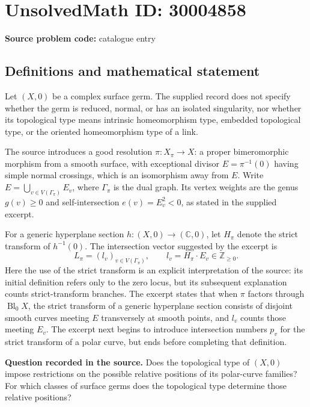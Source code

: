 \documentclass[11pt]{article}
\newcommand{\Z}{\mathbb{Z}}
\newcommand{\C}{\mathbb{C}}
\begin{document}
\section*{UnsolvedMath ID: 30004858}
\textbf{Source problem code:} catalogue entry
\subsection{Definitions and mathematical statement}
Let \((X,0)\) be a complex surface germ. The supplied record does not specify whether the germ is reduced, normal, or has an isolated singularity, nor whether its topological type means intrinsic homeomorphism type, embedded topological type, or the oriented homeomorphism type of a link.

The source introduces a good resolution \(\pi:X_\pi\to X\): a proper bimeromorphic morphism from a smooth surface, with exceptional divisor \(E=\pi^{-1}(0)\) having simple normal crossings, which is an isomorphism away from \(E\). Write \(E=\bigcup_{v\in V(\Gamma_\pi)}E_v\), where \(\Gamma_\pi\) is the dual graph. Its vertex weights are the genus \(g(v)\geq 0\) and self-intersection \(e(v)=E_v^2<0\), as stated in the supplied excerpt.

For a generic hyperplane section \(h:(X,0)\to(\C,0)\), let \(H_\pi\) denote the strict transform of \(h^{-1}(0)\). The intersection vector suggested by the excerpt is
\[
L_\pi=(l_v)_{v\in V(\Gamma_\pi)},\qquad l_v=H_\pi\cdot E_v\in\Z_{\geq0}.
\]
Here the use of the strict transform is an explicit interpretation of the source: its initial definition refers only to the zero locus, but its subsequent explanation counts strict-transform branches. The excerpt states that when \(\pi\) factors through \(\operatorname{Bl}_0X\), the strict transform of a generic hyperplane section consists of disjoint smooth curves meeting \(E\) transversely at smooth points, and \(l_v\) counts those meeting \(E_v\). The excerpt next begins to introduce intersection numbers \(p_v\) for the strict transform of a polar curve, but ends before completing that definition.

\textbf{Question recorded in the source.} Does the topological type of \((X,0)\) impose restrictions on the possible relative positions of its polar-curve families? For which classes of surface germs does the topological type determine those relative positions?
\end{document}

